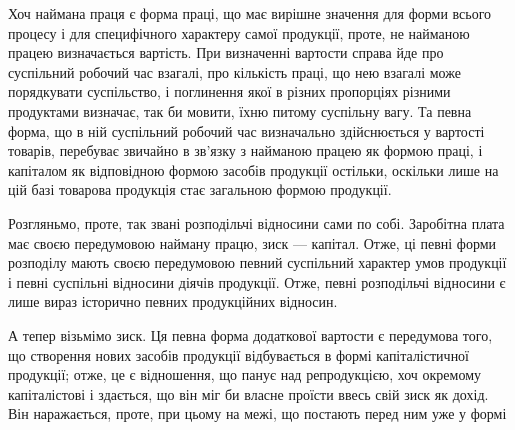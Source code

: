 Хоч наймана праця є форма праці, що має вирішне значення для
форми всього процесу і для специфічного характеру самої продукції, проте,
не найманою працею визначається вартість. При визначенні вартости справа
йде про суспільний робочий час взагалі, про кількість праці, що нею взагалі
може порядкувати суспільство, і поглинення якої в різних пропорціях різними
продуктами визначає, так би мовити, їхню питому суспільну вагу. Та певна форма,
що в ній суспільний робочий час визначально здійснюється у вартості товарів,
перебуває звичайно в зв’язку з найманою працею як формою праці, і капіталом
як відповідною формою засобів продукції остільки, оскільки лише на цій базі
товарова продукція стає загальною формою продукції.

Розгляньмо, проте, так звані розподільчі відносини сами по собі. Заробітна
плата має своєю передумовою найману працю, зиск — капітал. Отже, ці певні
форми розподілу мають своєю передумовою певний суспільний характер умов
продукції і певні суспільні відносини діячів продукції. Отже, певні розподільчі
відносини є лише вираз історично певних продукційних відносин.

А тепер візьмімо зиск. Ця певна форма додаткової вартости є передумова
того, що створення нових засобів продукції відбувається в формі капіталістичної
продукції; отже, це є відношення, що панує над репродукцією, хоч окремому
капіталістові і здається, що він міг би власне проїсти ввесь свій зиск як дохід. Він
наражається, проте, при цьому на межі, що постають перед ним уже у формі
\parbreak{}  %
